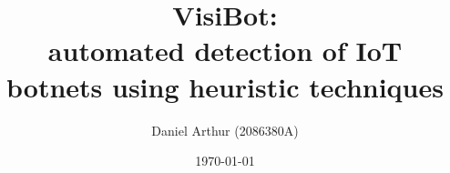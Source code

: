 \documentclass{l4proj}
\begin{document}
\title{VisiBot:\\automated detection of IoT botnets using heuristic techniques}
\author{Daniel Arthur (2086380A)}
\date{\today}

\maketitle



\def\consentname {Daniel Arthur}
\def\consentdate {\today}
\educationalconsent



\tableofcontents









% 


\end{document}
